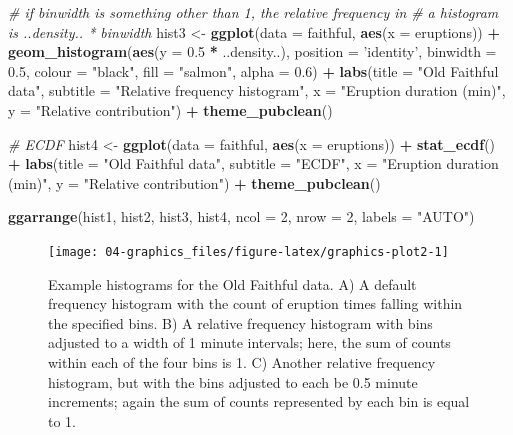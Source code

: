 \documentclass[english,10pt,a4paper,oneside]{book}
\newenvironment{Shaded}{\begin{snugshade}}{\end{snugshade}}
\newcommand{\KeywordTok}[1]{\textcolor[rgb]{0.13,0.29,0.53}{\textbf{#1}}}
\newcommand{\DataTypeTok}[1]{\textcolor[rgb]{0.13,0.29,0.53}{#1}}
\newcommand{\DecValTok}[1]{\textcolor[rgb]{0.00,0.00,0.81}{#1}}
\newcommand{\FloatTok}[1]{\textcolor[rgb]{0.00,0.00,0.81}{#1}}
\newcommand{\StringTok}[1]{\textcolor[rgb]{0.31,0.60,0.02}{#1}}
\newcommand{\CommentTok}[1]{\textcolor[rgb]{0.56,0.35,0.01}{\textit{#1}}}
\newcommand{\OperatorTok}[1]{\textcolor[rgb]{0.81,0.36,0.00}{\textbf{#1}}}
\newcommand{\NormalTok}[1]{#1}
\theoremstyle{definition}
\theoremstyle{definition}
\theoremstyle{definition}
\theoremstyle{remark}
\begin{document}
\begin{Shaded}
\begin{Highlighting}[]
\CommentTok{# if binwidth is something other than 1, the relative frequency in}
\CommentTok{# a histogram is ..density.. * binwidth}
\NormalTok{hist3 <-}\StringTok{ }\KeywordTok{ggplot}\NormalTok{(}\DataTypeTok{data =}\NormalTok{ faithful, }\KeywordTok{aes}\NormalTok{(}\DataTypeTok{x =}\NormalTok{ eruptions)) }\OperatorTok{+}
\StringTok{  }\KeywordTok{geom_histogram}\NormalTok{(}\KeywordTok{aes}\NormalTok{(}\DataTypeTok{y =} \FloatTok{0.5} \OperatorTok{*}\StringTok{ }\NormalTok{..density..),}
                 \DataTypeTok{position =} \StringTok{'identity'}\NormalTok{, }\DataTypeTok{binwidth =} \FloatTok{0.5}\NormalTok{,}
                 \DataTypeTok{colour =} \StringTok{"black"}\NormalTok{, }\DataTypeTok{fill =} \StringTok{"salmon"}\NormalTok{, }\DataTypeTok{alpha =} \FloatTok{0.6}\NormalTok{) }\OperatorTok{+}
\StringTok{  }\KeywordTok{labs}\NormalTok{(}\DataTypeTok{title =} \StringTok{"Old Faithful data"}\NormalTok{,}
       \DataTypeTok{subtitle =} \StringTok{"Relative frequency histogram"}\NormalTok{,}
       \DataTypeTok{x =} \StringTok{"Eruption duration (min)"}\NormalTok{,}
       \DataTypeTok{y =} \StringTok{"Relative contribution"}\NormalTok{) }\OperatorTok{+}\StringTok{ }\KeywordTok{theme_pubclean}\NormalTok{()}

\CommentTok{# ECDF}
\NormalTok{hist4 <-}\StringTok{ }\KeywordTok{ggplot}\NormalTok{(}\DataTypeTok{data =}\NormalTok{ faithful, }\KeywordTok{aes}\NormalTok{(}\DataTypeTok{x =}\NormalTok{ eruptions)) }\OperatorTok{+}\StringTok{ }
\StringTok{  }\KeywordTok{stat_ecdf}\NormalTok{() }\OperatorTok{+}
\StringTok{  }\KeywordTok{labs}\NormalTok{(}\DataTypeTok{title =} \StringTok{"Old Faithful data"}\NormalTok{,}
       \DataTypeTok{subtitle =} \StringTok{"ECDF"}\NormalTok{,}
       \DataTypeTok{x =} \StringTok{"Eruption duration (min)"}\NormalTok{,}
       \DataTypeTok{y =} \StringTok{"Relative contribution"}\NormalTok{) }\OperatorTok{+}\StringTok{ }\KeywordTok{theme_pubclean}\NormalTok{()}

\KeywordTok{ggarrange}\NormalTok{(hist1, hist2, hist3, hist4, }\DataTypeTok{ncol =} \DecValTok{2}\NormalTok{, }\DataTypeTok{nrow =} \DecValTok{2}\NormalTok{, }\DataTypeTok{labels =} \StringTok{"AUTO"}\NormalTok{)}
\end{Highlighting}
\end{Shaded}

\begin{figure}
\texttt{[image: 04-graphics\_files/figure-latex/graphics-plot2-1]} \caption{Example histograms for the Old Faithful data. A) A default frequency histogram with the count of eruption times falling within the specified bins. B) A relative frequency histogram with bins adjusted to a width of 1 minute intervals; here, the sum of counts within each of the four bins is 1. C) Another relative frequency histogram, but with the bins adjusted to each be 0.5 minute increments; again the sum of counts represented by each bin is equal to 1.}\label{fig:graphics-plot2}
\end{figure}
\end{document}
